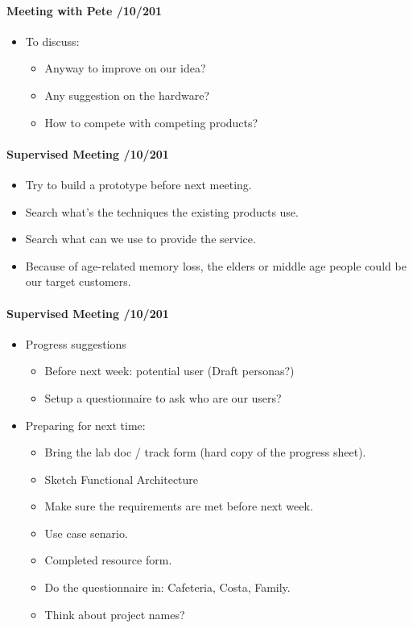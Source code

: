\documentclass[12pt,a4paper]{article}
\begin{document}
\begin{appendices}
      \paragraph{Meeting with Pete /10/201}
      \begin{itemize}
      \item To discuss: 
        \begin{itemize}
          \item Anyway to improve on our idea?
          \item Any suggestion on the hardware?
          \item How to compete with competing products?
        \end{itemize}
      \end{itemize}
      
      \paragraph{Supervised Meeting /10/201}
      \begin{itemize}
      \item Try to build a prototype before next meeting.
      \item Search what's the techniques the existing products use.
      \item Search what can we use to provide the service.
      \item Because of age-related memory loss, the elders or middle age people could be our target customers.
      \end{itemize}
      
      
      \paragraph{Supervised Meeting /10/201}
      \begin{itemize}
      \item Progress suggestions
        \begin{itemize}
        \item Before next week: potential user (Draft personas?)
        \item Setup a questionnaire to ask who are our users? 
        \end{itemize}
      \item Preparing for next time:
        \begin{itemize}
          \item Bring the lab doc / track form (hard copy of the progress sheet).
          \item Sketch Functional Architecture 
          \item Make sure the requirements are met before next week.
          \item Use case senario.
          \item Completed resource form.
          \item Do the questionnaire in: Cafeteria, Costa, Family.
          \item Think about project names?
        \end{itemize}	
      \end{itemize}
      

\end{appendices}
\end{document}
